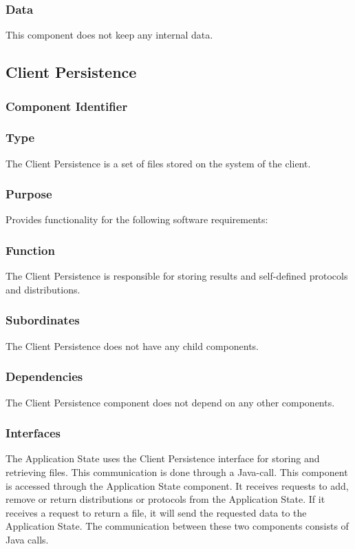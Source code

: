 \subsubsection*{Data}
This component does not keep any internal data.

\subsection{Client Persistence}

\subsubsection*{Component Identifier}
\RTMCCP{}

\subsubsection*{Type}
The Client Persistence is a set of files stored on the system of the client.

\subsubsection*{Purpose}
Provides functionality for the following software requirements:

\noindent {}

\subsubsection*{Function}
The Client Persistence is responsible for storing results and self-defined protocols and distributions.

\subsubsection*{Subordinates}
The Client Persistence does not have any child components.

\subsubsection*{Dependencies}
The Client Persistence component does not depend on any other components.

\subsubsection*{Interfaces}
The Application State uses the Client Persistence interface for storing and retrieving files. This communication is done through a Java-call.
This component is accessed through the Application State component. It receives requests to add, remove or return distributions or protocols from the Application State. If it receives a request to return a file, it will send the requested data to the Application State. The communication between these two components consists of Java calls.

